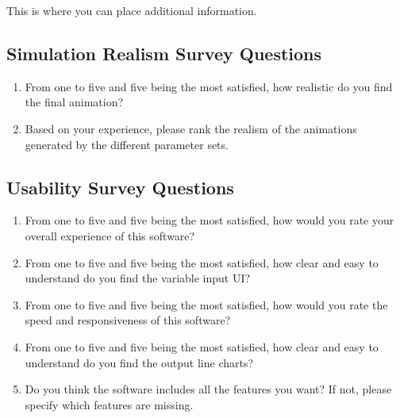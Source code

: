 \documentclass[12pt, titlepage]{article}
\begin{document}
This is where you can place additional information.



\subsection{Simulation Realism Survey Questions} \label{realismSurvey}

\begin{enumerate}
\item From one to five and five being the most satisfied, how realistic do you 
find the final animation?
\item Based on your experience, please rank the realism of the animations 
generated by the different parameter sets.
\end{enumerate}

\subsection{Usability Survey Questions} \label{usablitySurvey}

\begin{enumerate}
\item From one to five and five being the most satisfied, how would you rate 
your overall experience of this software?
\item From one to five and five being the most satisfied, how clear and easy 
to understand do you find the variable input UI?
\item From one to five and five being the most satisfied, how would you rate 
the speed and responsiveness of this software?
\item From one to five and five being the most satisfied, how clear and easy 
to understand do you find the output line charts?
\item Do you think the software includes all the features you want? If not, 
please specify which features are missing.
\end{enumerate}

\end{document}
